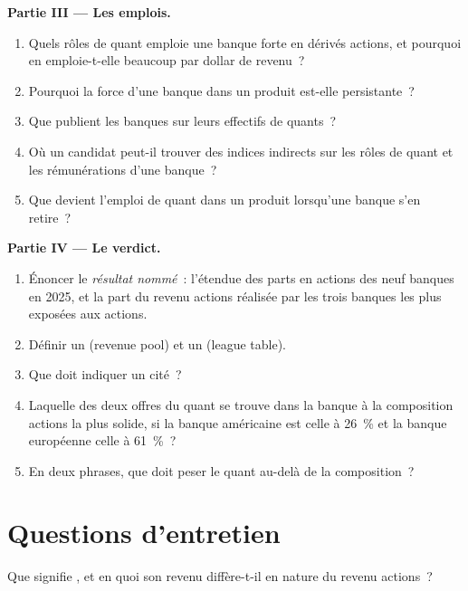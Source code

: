 \begin{problem}
\medskip\noindent\textbf{Partie III --- Les emplois.}
\begin{enumerate}[resume]
\item Quels rôles de quant emploie une banque forte en dérivés actions, et pourquoi en emploie-t-elle beaucoup par dollar de revenu~?
\item Pourquoi la force d'une banque dans un produit est-elle persistante~?
\item Que publient les banques sur leurs effectifs de quants~?
\item Où un candidat peut-il trouver des indices indirects sur les rôles de quant et les rémunérations d'une banque~?
\item Que devient l'emploi de quant dans un produit lorsqu'une banque s'en retire~?
\end{enumerate}

\medskip\noindent\textbf{Partie IV --- Le verdict.}
\begin{enumerate}[resume]
\item Énoncer le \emph{résultat nommé}~: l'étendue des parts en actions des neuf banques en 2025, et la part du
revenu actions réalisée par les trois banques les plus exposées aux actions.
\item Définir un  (revenue pool) et un  (league table).
\item Que doit indiquer un  cité~?
\item Laquelle des deux offres du quant se trouve dans la banque à la composition actions la plus solide, si la banque américaine est celle à 26~\%
et la banque européenne celle à 61~\%~?
\item En deux phrases, que doit peser le quant au-delà de la composition~?
\end{enumerate}
\end{problem}

\section{Questions d'entretien}

\begin{interviewq}\label{iq:in:bank-markets-divisions:1}
Que signifie , et en quoi son revenu diffère-t-il en nature du revenu actions~?
\end{interviewq}

